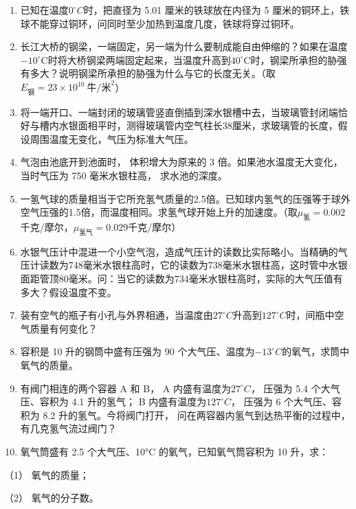 \begin{enumerate}
\def\labelenumi{\arabic{enumi}.}
\setcounter{enumi}{24}
\item
  已知在温度\(0^{\circ}C\)时，把直径为 5.01 厘米的铁球放在内径为 5
  厘米的铜环上，铁球不能穿过铜环，问同时至少加热到温度几度，铁球将穿过铜环。
\item
  长江大桥的钢梁，一端固定，另一端为什么要制成能自由伸缩的？如果在温度\(-10^{\circ}\mathrm{C}\)时将大桥钢梁两端固定起来，当温度升高到\(40^{\circ}\mathrm{C}\)时，钢梁所承担的胁强有多大？说明钢梁所承担的胁强为什么与它的长度无关。（取\(E_{\text{钢}} = 23 \times 10^{10} \mathrm{~牛} / \mathrm{米}^{2}\)）
\item
  将一端开口、一端封闭的玻璃管竖直倒插到深水银槽中去，当玻璃管封闭端恰好与槽内水银面相平时，测得玻璃管内空气柱长38厘米，求玻璃管的长度，假设周围温度无变化，气压为标准大气压。
\item
  气泡由池底开到池面时， 体积增大为原来的 3 倍。如果池水温度无大变化，
  当时气压为 750 毫米水银柱高， 求水池的深度。
\item
  一氢气球的质量相当于它所充氢气质量的2.5倍。已知球内氢气的压强等于球外空气压强的1.5倍，而温度相同。求氢气球开始上升的加速度。（取\(\mu_{\text{氢}}=0.002\)千克/摩尔，\(\mu_{\text{氢气}}=0.029\)千克/摩尔）
\item
  水银气压计中混进一个小空气泡，造成气压计的读数比实际略小。当精确的气压计读数为748毫米水银柱高时，它的读数为738毫米水银柱高，这时管中水银面距管顶80毫米。问：当它的读数为734毫米水银柱高时，实际的大气压值有多大？假设温度不变。
\item
  装有空气的瓶子有小孔与外界相通，当温度由\(27^{\circ}C\)升高到\(127^{\circ}C\)时，间瓶中空气质量有何变化？
\item
  容积是 10 升的钢筒中盛有压强为 90
  个大气压、温度为\(-13^{\circ}C\)的氧气，求筒中氧气的质量。
\item
  有阀门相连的两个容器 A 和 B， A 内盛有温度为\(27^{\circ}C\)， 压强为
  5.4 个大气压、容积为 4.1 升的氢气； B 内盛有温度为\(127^{\circ}C\)，
  压强为 6 个大气压、容积为 8.2 升的氢气。今将阀门打开，
  问在两容器内氢气到达热平衡的过程中， 有几克氢气流过阀门？
\item
  氧气筒盛有 2.5 个大气压、10°C 的氧气，已知氧气筒容积为 10 升，求：
\end{enumerate}

（1） 氧气的质量；

（2） 氧气的分子数。

